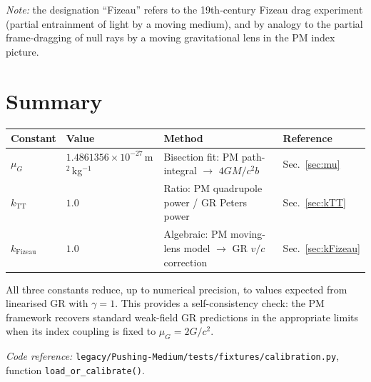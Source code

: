 \documentclass{article}
\begin{document}
\textit{Note:} the designation ``Fizeau'' refers to the 19th-century Fizeau
drag experiment (partial entrainment of light by a moving medium), and by
analogy to the partial frame-dragging of null rays by a moving gravitational
lens in the PM index picture.

\section{Summary}

\begin{center}
\begin{tabular}{llll}
\toprule
\textbf{Constant} & \textbf{Value} & \textbf{Method} & \textbf{Reference} \\
\midrule
$\mu_G$ & $1.4861356 \times 10^{-27}$\,m$^2$\,kg$^{-1}$
         & Bisection fit: PM path-integral $\to$ $4GM/c^2b$
         & Sec.~\ref{sec:mu} \\
$k_{\mathrm{TT}}$ & $1.0$
         & Ratio: PM quadrupole power / GR Peters power
         & Sec.~\ref{sec:kTT} \\
$k_{\mathrm{Fizeau}}$ & $1.0$
         & Algebraic: PM moving-lens model $\to$ GR $v/c$ correction
         & Sec.~\ref{sec:kFizeau} \\
\bottomrule
\end{tabular}
\end{center}

\bigskip
All three constants reduce, up to numerical precision, to values expected from
linearised GR with $\gamma = 1$.  This provides a self-consistency check: the
PM framework recovers standard weak-field GR predictions in the appropriate
limits when its index coupling is fixed to $\mu_G = 2G/c^2$.

\bigskip\noindent
\textit{Code reference:}
\texttt{legacy/Pushing-Medium/tests/fixtures/calibration.py},
function \texttt{load\_or\_calibrate()}.
\end{document}

